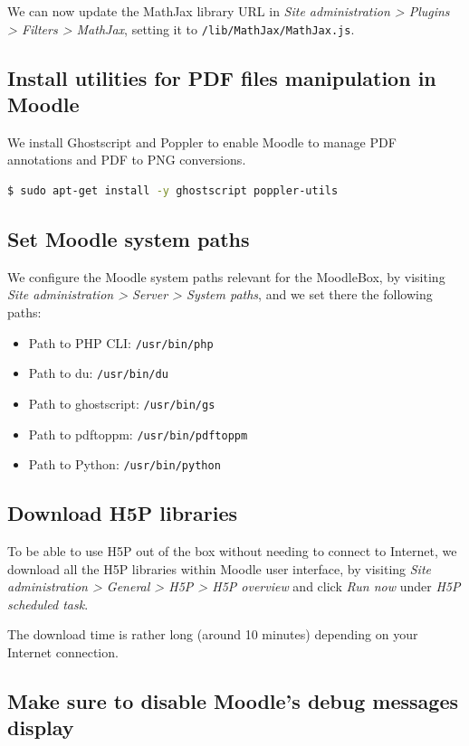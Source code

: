 \documentclass[12pt]{article}
\begin{document}
We can now update the MathJax library URL in \emph{Site administration > Plugins > Filters > MathJax}, setting it to \lstinline{/lib/MathJax/MathJax.js}.

\subsection{Install utilities for PDF files manipulation in Moodle}

We install Ghostscript and Poppler to enable Moodle to manage PDF annotations and PDF to PNG conversions.
\begin{lstlisting}[language=bash]
$ sudo apt-get install -y ghostscript poppler-utils
\end{lstlisting}

\subsection{Set Moodle system paths}

We configure the Moodle system paths relevant for the MoodleBox, by visiting \emph{Site administration > Server > System paths}, and we set there the following paths:
\begin{itemize}
\item Path to PHP CLI: \texttt{/usr/bin/php}
\item Path to du: \texttt{/usr/bin/du}
\item Path to ghostscript: \texttt{/usr/bin/gs}
\item Path to pdftoppm: \texttt{/usr/bin/pdftoppm}
\item Path to Python: \texttt{/usr/bin/python}
\end{itemize}

\subsection{Download H5P libraries}

To be able to use H5P out of the box without needing to connect to Internet, we download all the H5P libraries within Moodle user interface, by visiting \emph{Site administration > General > H5P > H5P overview} and click \emph{Run now} under \emph{H5P scheduled task}.

The download time is rather long (around 10 minutes) depending on your Internet connection.

\subsection{Make sure to disable Moodle's debug messages display}
\end{document}
